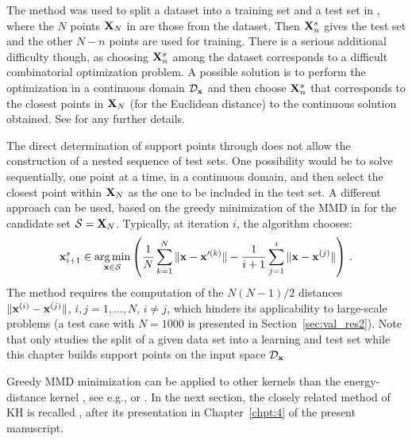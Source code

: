 The method was used to split a dataset into a training set and a test set in \citet{josvak21}, where the $N$ points ${\bf X}_N$ in  are those from the dataset.
Then ${\bf X}_n^s$ gives the test set and the other $N-n$ points are used for training. 
There is a serious additional difficulty though, as choosing ${\bf X}_n^s$ among the dataset corresponds to a difficult combinatorial optimization problem. 
A possible solution is to perform the optimization in a continuous domain $\mathcal{D}_{\bf x}$ and then choose ${\bf X}_n^s$ that corresponds to the closest points in ${\bf X}_N$ (for the Euclidean distance) to the continuous solution obtained. 
See \citet{josvak21} for any further details. 

The direct determination of support points through  does not allow the construction of a nested sequence of test sets. 
One possibility would be to solve  sequentially, one point at a time, in a continuous domain, and then select the closest point within ${\bf X}_N$ as the one to be included in the test set. 
A different approach can be used, based on the greedy minimization of the MMD in  for the candidate set $\mathcal{S}={\bf X}_N$. 
Typically, at iteration $i$, the algorithm chooses:
\begin{equation}\label{eq:GreedySP}
{\bf x}_{i+1}^s \in \operatorname*{arg\,min}_{{\bf x}\in\mathcal{S}} \left( \frac{1}{N} \sum_{k=1}^N \|{\bf x}-{\bf x}'^{(k)}\| - \frac{1}{i+1} \sum_{j=1}^{i} \|{\bf x}-{\bf x}^{(j)}\| \right) \,.
\end{equation}
The method requires the computation of the $N(N-1)/2$ distances $\|{\bf x}^{(i)}-{\bf x}^{(j)}\|$, $i,j=1,\ldots,N$, $i\neq j$, which hinders its applicability to large-scale problems (a test case with $N=1000$ is presented in Section~\ref{sec:val_res2}). 
Note that \citet{josvak21} only studies the split of a given data set into a learning and test set while this chapter builds support points on the input space $\mathcal{D}_{\bf x}$

Greedy MMD minimization can be applied to other kernels than the energy-distance kernel , see e.g., \citet{teymur_gorham_2021} or \citet{pronzato_2021}. 
In the next section, the closely related method of KH is recalled \citep{chen_welling_2010}, after its presentation in Chapter~\ref{chpt:4} of the present manuscript.

